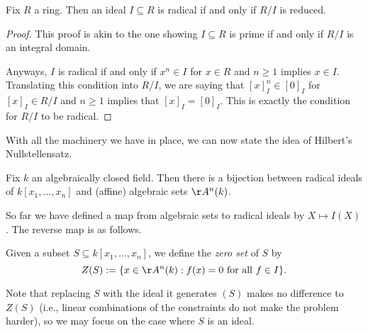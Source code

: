 \documentclass[../notes.tex]{subfiles}
\begin{document}
\begin{lemma}
	Fix $R$ a ring. Then an ideal $I\subseteq R$ is radical if and only if $R/I$ is reduced.
\end{lemma}
\begin{proof}
	This proof is akin to the one showing $I\subseteq R$ is prime if and only if $R/I$ is an integral domain.

	Anyways, $I$ is radical if and only if $x^n\in I$ for $x\in R$ and $n\ge1$ implies $x\in I$. Translating this condition into $R/I$, we are saying that $[x]_I^n\in[0]_I$ for $[x]_I\in R/I$ and $n\ge1$ implies that $[x]_I=[0]_I$. This is exactly the condition for $R/I$ to be radical.
\end{proof}
With all the machinery we have in place, we can now state the idea of Hilbert's Nullstellensatz.
\begin{theorem}[Nullstellensatz, I]
	Fix $k$ an algebraically closed field. Then there is a bijection between radical ideals of $k[x_1,\ldots,x_n]$ and (affine) algebraic sets $\AA^n(k)$.
\end{theorem}
So far we have defined a map from algebraic sets to radical ideals by $X\mapsto I(X)$. The reverse map is as follows.
\begin{defihelper}[\texorpdfstring{$Z(I)$}{Z(I)}] 
	Given a subset $S\subseteq k[x_1,\ldots,x_n]$, we define the \textit{zero set} of $S$ by
	\[Z(S):=\{x\in\AA^n(k):f(x)=0\text{ for all }f\in I\}.\]
\end{defihelper}
Note that replacing $S$ with the ideal it generates $(S)$ makes no difference to $Z(S)$ (i.e., linear combinations of the constraints do not make the problem harder), so we may focus on the case where $S$ is an ideal.
\end{document}
